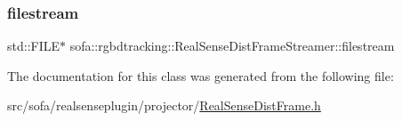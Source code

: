 \subsubsection{\texorpdfstring{filestream}{filestream}}
{\footnotesize\ttfamily std\+::\+F\+I\+LE$\ast$ sofa\+::rgbdtracking\+::\+Real\+Sense\+Dist\+Frame\+Streamer\+::filestream}



The documentation for this class was generated from the following file\+:\begin{DoxyCompactItemize}
\item 
src/sofa/realsenseplugin/projector/\hyperlink{_real_sense_dist_frame_8h}{Real\+Sense\+Dist\+Frame.\+h}\end{DoxyCompactItemize}

